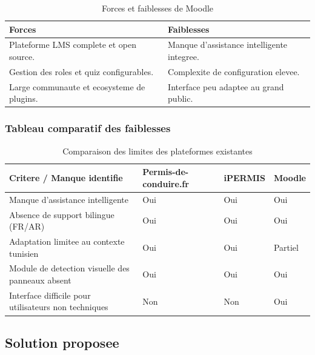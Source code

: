 \documentclass[a4paper,12pt]{report}
\begin{document}
\begin{table}[H]
  \centering
  \caption{Forces et faiblesses de Moodle}
  \label{tab:moodle}
  \begin{tabularx}{\textwidth}{X X}
    \toprule
    \textbf{Forces} & \textbf{Faiblesses} \\
    \midrule
    Plateforme LMS complete et open source.
      & Manque d'assistance intelligente integree. \\
    Gestion des roles et quiz configurables.
      & Complexite de configuration elevee. \\
    Large communaute et ecosysteme de plugins.
      & Interface peu adaptee au grand public. \\
    \bottomrule
  \end{tabularx}
\end{table}

\subsubsection{Tableau comparatif des faiblesses}

\begin{table}[H]
  \centering
  \caption{Comparaison des limites des plateformes existantes}
  \label{tab:comparatif}
  \begin{tabularx}{\textwidth}{
    >{\raggedright\arraybackslash}X
    >{\centering\arraybackslash}p{2.8cm}
    >{\centering\arraybackslash}p{2.2cm}
    >{\centering\arraybackslash}p{2cm}
  }
    \toprule
    \textbf{Critere / Manque identifie}
      & \textbf{Permis-de-conduire.fr}
      & \textbf{iPERMIS}
      & \textbf{Moodle} \\
    \midrule
    Manque d'assistance intelligente
      & Oui & Oui & Oui \\
    Absence de support bilingue (FR/AR)
      & Oui & Oui & Oui \\
    Adaptation limitee au contexte tunisien
      & Oui & Oui & Partiel \\
    Module de detection visuelle des panneaux absent
      & Oui & Oui & Oui \\
    Interface difficile pour utilisateurs non techniques
      & Non & Non & Oui \\
    \bottomrule
  \end{tabularx}
\end{table}

\subsection{Solution proposee}
\end{document}

